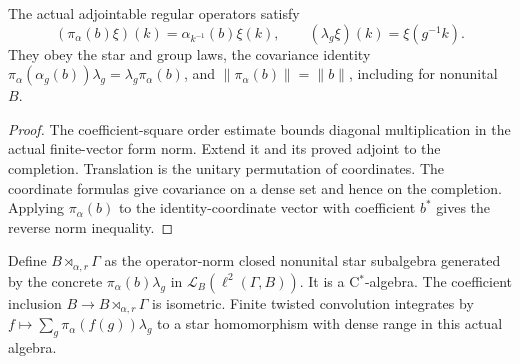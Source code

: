 \begin{proposition}\label{prop:regular-crossed-operators}
\leanok
The actual adjointable regular operators satisfy
\[
 (\pi_\alpha(b)\xi)(k)=\alpha_{k^{-1}}(b)\xi(k),\qquad
 (\lambda_g\xi)(k)=\xi(g^{-1}k).
\]
They obey the star and group laws, the covariance identity
$\pi_\alpha(\alpha_g(b))\lambda_g=\lambda_g\pi_\alpha(b)$,
and $\|\pi_\alpha(b)\|=\|b\|$, including for nonunital $B$.
\end{proposition}
\begin{proof}
\leanok
The coefficient-square order estimate bounds diagonal multiplication in
the actual finite-vector form norm. Extend it and its proved adjoint to
the completion. Translation is the unitary permutation of coordinates.
The coordinate formulas give covariance on a dense set and hence on the
completion. Applying $\pi_\alpha(b)$ to the identity-coordinate vector
with coefficient $b^*$ gives the reverse norm inequality.
\end{proof}

\begin{definition}\label{def:reduced-crossed-product}
\leanok
Define $B\rtimes_{\alpha,r}\Gamma$ as the operator-norm closed nonunital
star subalgebra generated by the concrete $\pi_\alpha(b)\lambda_g$ in
$\mathcal L_B(\ell^2(\Gamma,B))$. It is a C$^*$-algebra.
The coefficient inclusion $B\to B\rtimes_{\alpha,r}\Gamma$ is isometric.
Finite twisted convolution integrates by
$f\mapsto\sum_g\pi_\alpha(f(g))\lambda_g$ to a star homomorphism with
dense range in this actual algebra.
\end{definition}

